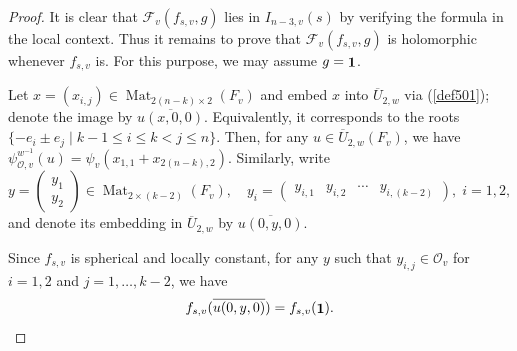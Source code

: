 \documentclass[11pt,notitlepage]{amsart}
\theoremstyle{definition}
\theoremstyle{remark}
\newcommand{\calF}{\mathcal{F}}
\newcommand{\calO}{\mathcal{O}}
\DeclareMathOperator{\id}{{\bf 1}}
\DeclareMathOperator{\Mat}{Mat}
\begin{document}
\begin{proof}
It is clear that $\calF_v(f_{s,v},g)$ lies in $I_{n-3,v}(s)$ by verifying the formula in the local context. Thus it remains to prove that $\calF_v(f_{s,v},g)$ is holomorphic whenever $f_{s,v}$ is. For this purpose, we may assume $g=\id$.

\medskip
\noindent

Let $x=(x_{i,j})\in \Mat_{2(n-k)\times 2}(F_v)$ and embed $x$ into $\overline{U}_{2,w}$ via (\ref{def501}); denote the image by $\overline{u(x,0,0)}$. Equivalently, it corresponds to the roots
$\{-e_i\pm e_j \mid k-1\le i\le k<j\le n\}.$
Then, for any $u\in \overline{U}_{2,w}(F_v)$, we have $\psi_{\calO,v}^{w^{-1}}(u)=\psi_v(x_{1,1}+x_{2(n-k),2})$.
Similarly, write
\begin{equation}\label{iota2}
  y = \begin{pmatrix}
    y_1\\
    y_2
  \end{pmatrix}\in\Mat_{2\times (k-2)}(F_v), \quad
  y_i = \begin{pmatrix}
    y_{i,1}&y_{i,2}&\cdots&y_{i,(k-2)}
  \end{pmatrix},\; i =1,2,
\end{equation}
and denote its embedding in $\overline{U}_{2,w}$ by $\overline{u(0,y,0)}$.

Since $f_{s,v}$ is spherical and locally constant, for any $y$ such that
$y_{i,j}\in \calO_v$ for $i=1,2$ and $j=1,\dots,k-2$, we have
\begin{equation}\label{inv01}
  f_{s,v}(\overline{u(0,y,0)}) = f_{s,v}(\id).
\end{equation}


\end{proof}
\end{document}
